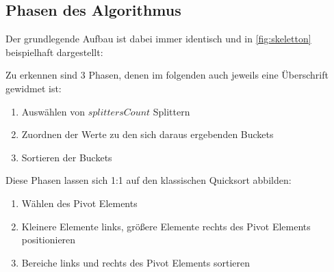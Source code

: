 	\subsection{Phasen des Algorithmus}
		Der grundlegende Aufbau ist dabei immer identisch und in \ref{fig:skeletton} beispielhaft dargestellt:
		
		Zu erkennen sind 3 Phasen, denen im folgenden auch jeweils eine Überschrift gewidmet ist:
		\begin{enumerate}
			\item Auswählen von $\textit{splittersCount}$ Splittern
			\item Zuordnen der Werte zu den sich daraus ergebenden Buckets
			\item Sortieren der Buckets
		\end{enumerate}
		Diese Phasen lassen sich 1:1 auf den klassischen Quicksort abbilden:
		\begin{enumerate}
			\item Wählen des Pivot Elements
			\item Kleinere Elemente links, größere Elemente rechts des Pivot Elements positionieren
			\item Bereiche links und rechts des Pivot Elements sortieren
		\end{enumerate}
		

